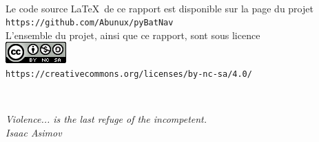 \newpage
\ \\
\vfill

\begin{center}
Le code source \LaTeX\ de ce rapport est disponible sur la page du projet\\ \medskip
\texttt{https://github.com/Abunux/pyBatNav}\\ 
\vfill
L'ensemble du projet, ainsi que ce rapport, sont sous licence\\ \medskip
\includegraphics[scale=1]{./media/CC-Logo.png}\\
\texttt{https://creativecommons.org/licenses/by-nc-sa/4.0/}
\end{center}

\newpage
\ \\
\vspace{3cm}
\begin{flushright}


\textit{Violence... is the last refuge of the incompetent.\\
\medskip
Isaac Asimov
}

\end{flushright}
\vfill

\clearpage{\pagestyle{empty}\cleardoublepage}
\setcounter{tocdepth}{2}
\tableofcontents
